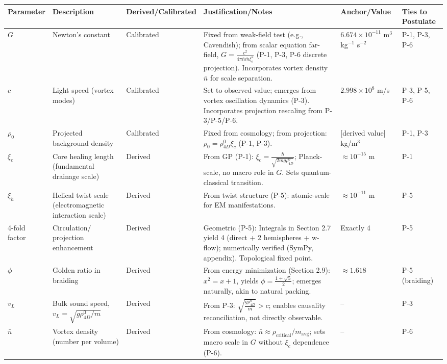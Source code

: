 \begin{table}[H]
\centering
\small
\begin{tabularx}{\linewidth}{|p{1.5cm}|p{2cm}|l|X|p{3cm}|p{3cm}|}
\hline
Parameter & Description & Derived/Calibrated & Justification/Notes & Anchor/Value & Ties to Postulate \\
\hline
$G$ & Newton's constant & Calibrated & Fixed from weak-field test (e.g., Cavendish); from scalar equation far-field, $G = \frac{c^2}{4\pi \bar{n} \bar{m} \xi_c^2}$ (P-1, P-3, P-6 discrete projection). Incorporates vortex density $\bar{n}$ for scale separation. & $6.674 \times 10^{-11}$ m$^3$ kg$^{-1}$ s$^{-2}$ & P-1, P-3, P-6 \\
\hline
$c$ & Light speed (vortex modes) & Calibrated & Set to observed value; emerges from vortex oscillation dynamics (P-3). Incorporates projection rescaling from P-3/P-5/P-6. & $2.998 \times 10^8$ m/s & P-3, P-5, P-6 \\
\hline
$\rho_0$ & Projected background density & Calibrated & Fixed from cosmology; from projection: $\rho_0 = \rho_{4D}^0 \xi_c$ (P-1, P-3). & [derived value] kg/m$^3$ & P-1, P-3 \\
\hline
$\xi_c$ & Core healing length (fundamental drainage scale) & Derived & From GP (P-1): $\xi_c = \frac{\hbar}{\sqrt{2 m g \rho_{4D}^0}}$; Planck-scale, no macro role in $G$. Sets quantum-classical transition. & $\approx 10^{-15}$ m & P-1 \\
\hline
$\xi_h$ & Helical twist scale (electromagnetic interaction scale) & Derived & From twist structure (P-5): atomic-scale for EM manifestations. & $\approx 10^{-11}$ m & P-5 \\
\hline
4-fold factor & Circulation/ projection enhancement & Derived & Geometric (P-5): Integrals in Section 2.7 yield 4 (direct + 2 hemispheres + w-flow); numerically verified (SymPy, appendix). Topological fixed point. & Exactly 4 & P-5 \\
\hline
$\phi$ & Golden ratio in braiding & Derived & From energy minimization (Section 2.9): $x^2 = x + 1$, yields $\phi = \frac{1 + \sqrt{5}}{2}$; emerges naturally, akin to natural packing. & $\approx 1.618$ & P-5 (braiding) \\
\hline
$v_L$ & Bulk sound speed, $v_L = \sqrt{g \rho_{4D}^0 / m}$ & Derived & From P-3: $\sqrt{\frac{g \rho_{4D}^0}{m}} > c$; enables causality reconciliation, not directly observable. & -- & P-3 \\
\hline
$\bar{n}$ & Vortex density (number per volume) & Derived & From cosmology: $\bar{n} \approx \rho_{\text{critical}} / m_{\text{avg}}$; sets macro scale in $G$ without $\xi_c$ dependence (P-6). & -- & P-6 \\

\end{tabularx}
\end{table}
